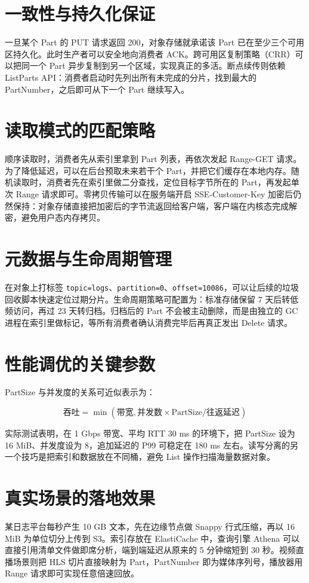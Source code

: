 \chapter{一致性与持久化保证}
一旦某个 Part 的 PUT 请求返回 200，对象存储就承诺该 Part 已在至少三个可用区持久化。此时生产者可以安全地向消费者 ACK。跨可用区复制策略（CRR）可以把同一个 Part 异步复制到另一个区域，实现真正的多活。断点续传则依赖 ListParts API：消费者启动时先列出所有未完成的分片，找到最大的 PartNumber，之后即可从下一个 Part 继续写入。\par
\chapter{读取模式的匹配策略}
顺序读取时，消费者先从索引里拿到 Part 列表，再依次发起 Range-GET 请求。为了降低延迟，可以在后台预取未来若干个 Part，并把它们缓存在本地内存。随机读取时，消费者先在索引里做二分查找，定位目标字节所在的 Part，再发起单次 Range 请求即可。零拷贝传输可以在服务端开启 SSE-Customer-Key 加密后仍然保持：对象存储直接把加密后的字节流返回给客户端，客户端在内核态完成解密，避免用户态内存拷贝。\par
\chapter{元数据与生命周期管理}
在对象上打标签 \texttt{topic=logs}、\texttt{partition=0}、\texttt{offset=10086}，可以让后续的垃圾回收脚本快速定位过期分片。生命周期策略可配置为：标准存储保留 7 天后转低频访问，再过 23 天转归档。归档后的 Part 不会被主动删除，而是由独立的 GC 进程在索引里做标记，等所有消费者确认消费完毕后再真正发出 Delete 请求。\par
\chapter{性能调优的关键参数}
PartSize 与并发度的关系可近似表示为：\par
$$ \text{吞吐} = \min(\text{带宽}, \text{并发数} \times \text{PartSize} / \text{往返延迟}) $$\par
实际测试表明，在 1 Gbps 带宽、平均 RTT 30 ms 的环境下，把 PartSize 设为 16 MiB、并发度设为 8，追加延迟的 P99 可稳定在 180 ms 左右。读写分离的另一个技巧是把索引和数据放在不同桶，避免 List 操作扫描海量数据对象。\par
\chapter{真实场景的落地效果}
某日志平台每秒产生 10 GB 文本，先在边缘节点做 Snappy 行式压缩，再以 16 MiB 为单位切分上传到 S3。索引存放在 ElastiCache 中，查询引擎 Athena 可以直接引用清单文件做即席分析，端到端延迟从原来的 5 分钟缩短到 30 秒。视频直播场景则把 HLS 切片直接映射为 Part，PartNumber 即为媒体序列号，播放器用 Range 请求即可实现任意倍速回放。\par
